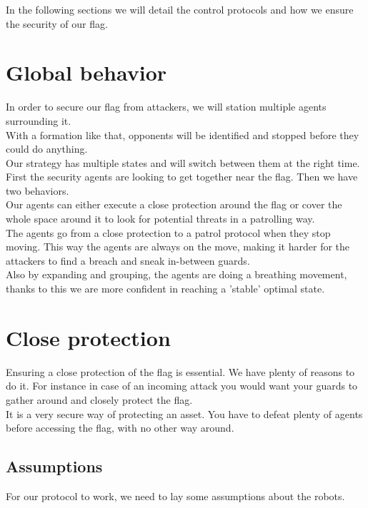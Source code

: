 \documentclass[journal]{IEEEtran}
\begin{document}
In the following sections we will detail the control protocols and how we ensure the security of our flag. 

\section{Global behavior}

In order to secure our flag from attackers, we will station multiple agents surrounding it.\\
With a formation like that, opponents will be identified and stopped before they could do anything.\\

Our strategy has multiple states and will switch between them at the right time.\\

First the security agents are looking to get together near the flag.
Then we have two behaviors.\\
Our agents can either execute a close protection around the flag or cover the whole space around it to look for potential threats in a patrolling way.\\

The agents go from a close protection to a patrol protocol when they stop moving.
This way the agents are always on the move, making it harder for the attackers to find a breach and sneak in-between guards.\\
Also by expanding and grouping, the agents are doing a breathing movement, thanks to this we are more confident in reaching a 'stable' optimal state. 

\section{Close protection}

Ensuring a close protection of the flag is essential. We have plenty of reasons to do it. For instance in case of an incoming attack you would want your guards to gather around and closely protect the flag.\\
It is a very secure way of protecting an asset. You have to defeat plenty of agents before accessing the flag, with no other way around.

\subsection{Assumptions}

For our protocol to work, we need to lay some assumptions about the robots.\\
\end{document}

